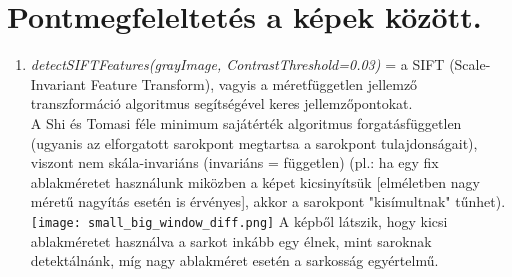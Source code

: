 \documentclass[12pt]{report}
\begin{document}
            \section{Pontmegfeleltetés a képek között.}
                \begin{enumerate}
                    \item \textit{detectSIFTFeatures(grayImage, ContrastThreshold=0.03)} = a SIFT (Scale-Invariant Feature Transform), vagyis a méretfüggetlen jellemző transzformáció algoritmus segítségével keres jellemzőpontokat.\\
                        A Shi és Tomasi féle minimum sajátérték algoritmus forgatásfüggetlen (ugyanis az elforgatott sarokpont megtartsa a sarokpont tulajdonságait), viszont nem skála-invariáns (invariáns = független) (pl.: ha egy fix ablakméretet használunk miközben a képet kicsinyítsük [elméletben nagy méretű nagyítás esetén is érvényes], akkor a sarokpont "kisímultnak" tűnhet).\\
                        \texttt{[image: small\_big\_window\_diff.png]}
                        A képből látszik, hogy kicsi ablakméretet használva a sarkot inkább egy élnek, mint saroknak detektálnánk, míg nagy ablakméret esetén a sarkosság egyértelmű.\\



\end{enumerate}
\end{document}
